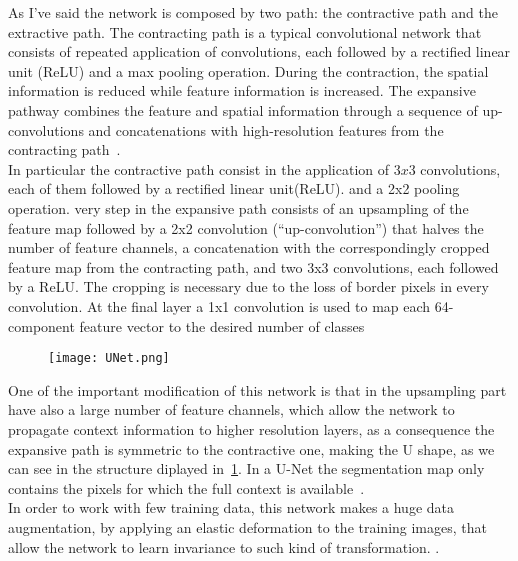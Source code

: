 \documentclass{standalone}
\begin{document}
		
		As I've said the network is composed by two path: the contractive path and the extractive path. The contracting path is a typical convolutional network that consists of repeated application of convolutions, each followed by a rectified linear unit (ReLU) and a max pooling operation. During the contraction, the spatial information is reduced while feature information is increased. The expansive pathway combines the feature and spatial information through a sequence of up-convolutions and concatenations with high-resolution features from the contracting path~\cite{ART:Johannes}.\\
		
		In particular the contractive path consist in the application of $3x3$ convolutions, each of them followed by a rectified linear unit(ReLU). and a 2x2 pooling operation. very step in the expansive path consists of an upsampling of the feature map followed by a 2x2 convolution (“up-convolution”) that halves the number of feature channels, a concatenation with the correspondingly cropped feature map from the contracting path, and two 3x3 convolutions, each followed by a ReLU. The cropping is necessary due to the loss of border pixels in every convolution. At the final layer a 1x1 convolution is used to map each 64-component feature vector to the desired number of classes
		
		\begin{figure}[h!]
			\centering
				\texttt{[image: UNet.png]}
					\caption{}\label{fig:UNet}
		\end{figure}
	
		One of the important modification of this network is that in the upsampling part  have also a large number of feature channels, which allow the network to propagate context information to higher resolution layers, as a consequence the expansive path is symmetric to the contractive one, making the U shape, as we can see in the structure diplayed in \figurename\,\ref{fig:UNet}. In a U-Net the segmentation map only contains the pixels for which the full context is available~\cite{ART:Johannes}.\\
		In order to work with few training data, this network makes a huge data augmentation, by applying an elastic deformation to the training images, that allow the network to learn invariance to such kind of transformation. 
. 
\end{document}
